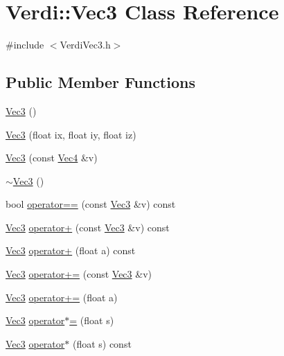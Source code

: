 \hypertarget{class_verdi_1_1_vec3}{\section{\-Verdi\-:\-:\-Vec3 \-Class \-Reference}
\label{class_verdi_1_1_vec3}
}


{\ttfamily \#include $<$\-Verdi\-Vec3.\-h$>$}

\subsection*{\-Public \-Member \-Functions}
\begin{DoxyCompactItemize}
\item 
\hyperlink{class_verdi_1_1_vec3_a8a68d5e80fdaf247615a5021a957908c}{\-Vec3} ()
\item 
\hyperlink{class_verdi_1_1_vec3_a0fb780bc670cb3cb1c6862a43f49f6f5}{\-Vec3} (float ix, float iy, float iz)
\item 
\hyperlink{class_verdi_1_1_vec3_afaeaf8db3c58065d3e7fe3d479e0abe7}{\-Vec3} (const \hyperlink{class_verdi_1_1_vec4}{\-Vec4} \&v)
\item 
\hyperlink{class_verdi_1_1_vec3_a07d80e987af37e1b3bf1b9468eff84c3}{$\sim$\-Vec3} ()
\item 
bool \hyperlink{class_verdi_1_1_vec3_a8187146f9e224ea66b12fe70fea14890}{operator==} (const \hyperlink{class_verdi_1_1_vec3}{\-Vec3} \&v) const 
\item 
\hyperlink{class_verdi_1_1_vec3}{\-Vec3} \hyperlink{class_verdi_1_1_vec3_a206abc287d8adfad8951be30c4e2bfd9}{operator+} (const \hyperlink{class_verdi_1_1_vec3}{\-Vec3} \&v) const 
\item 
\hyperlink{class_verdi_1_1_vec3}{\-Vec3} \hyperlink{class_verdi_1_1_vec3_a7397372267626e858a4f2a8f3949d19e}{operator+} (float a) const 
\item 
\hyperlink{class_verdi_1_1_vec3}{\-Vec3} \hyperlink{class_verdi_1_1_vec3_a69af0802cf97b9be591d6cd770e3ad7d}{operator+=} (const \hyperlink{class_verdi_1_1_vec3}{\-Vec3} \&v)
\item 
\hyperlink{class_verdi_1_1_vec3}{\-Vec3} \hyperlink{class_verdi_1_1_vec3_a97da3d2b294a977085f55f055c5715e5}{operator+=} (float a)
\item 
\hyperlink{class_verdi_1_1_vec3}{\-Vec3} \hyperlink{class_verdi_1_1_vec3_a591d78a9f8971c16d4573e6ad7e0b9cf}{operator$\ast$=} (float s)
\item 
\hyperlink{class_verdi_1_1_vec3}{\-Vec3} \hyperlink{class_verdi_1_1_vec3_aa361c55da8a74cb2b55d7dadae76bba8}{operator$\ast$} (float s) const 

\end{DoxyCompactItemize}
